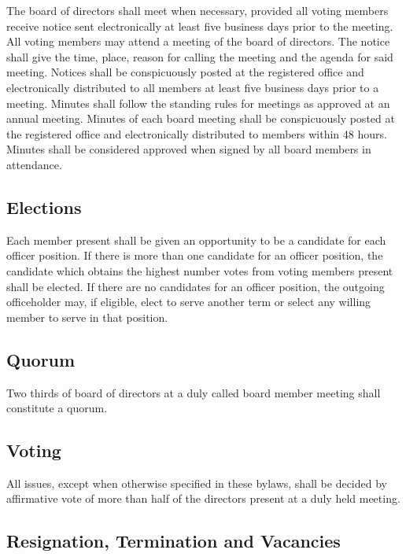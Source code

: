 \documentclass[10pt,letterpaper,titlepage]{article}
\begin{document}
The board of directors shall meet when necessary, provided all voting members
receive notice sent electronically at least five business days prior to the
meeting.
All voting members may attend a meeting of the board of directors.
The notice shall give the time, place, reason for calling the meeting and the
agenda for said meeting.
Notices shall be conspicuously posted at the registered office and
electronically distributed to all members at least five business days prior to
a meeting.
Minutes shall follow the standing rules for meetings as approved at an annual
meeting.
Minutes of each board meeting shall be conspicuously posted at the registered
office and electronically distributed to members within 48 hours.
Minutes shall be considered approved when signed by all board members in
attendance.

\subsection{Elections}
\label{elections}
 
Each member present shall be given an opportunity to be a candidate for each
officer position.
If there is more than one candidate for an officer position, the candidate
which obtains the highest number votes from voting members present shall be
elected.
If there are no candidates for an officer position, the outgoing officeholder
may, if eligible, elect to serve another term or select any willing member to
serve in that position.

\subsection{Quorum}
 
Two thirds of board of directors at a duly called board member meeting shall
constitute a quorum. 

\subsection{Voting}
 
All issues, except when otherwise specified in these bylaws, shall be decided
by affirmative vote of more than half of the directors present at a duly held
meeting. 

\subsection{Resignation, Termination and Vacancies}
 
\end{document}
